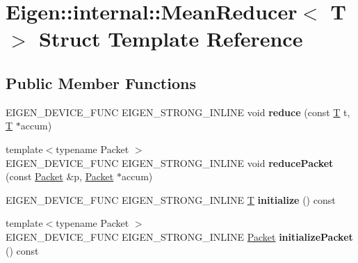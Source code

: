 \hypertarget{struct_eigen_1_1internal_1_1_mean_reducer}{}\section{Eigen\+:\+:internal\+:\+:Mean\+Reducer$<$ T $>$ Struct Template Reference}
\label{struct_eigen_1_1internal_1_1_mean_reducer}
\subsection*{Public Member Functions}
\begin{DoxyCompactItemize}
\item 
\mbox{\label{struct_eigen_1_1internal_1_1_mean_reducer_adecc23997b0000f8d1ab64e25ab0dee4}} 
E\+I\+G\+E\+N\+\_\+\+D\+E\+V\+I\+C\+E\+\_\+\+F\+U\+NC E\+I\+G\+E\+N\+\_\+\+S\+T\+R\+O\+N\+G\+\_\+\+I\+N\+L\+I\+NE void {\bfseries reduce} (const \hyperlink{group___sparse_core___module}{T} t, \hyperlink{group___sparse_core___module}{T} $\ast$accum)
\item 
\mbox{\label{struct_eigen_1_1internal_1_1_mean_reducer_a5f5ab34d27356ed03bf03c53be5820e3}} 
{\footnotesize template$<$typename Packet $>$ }\\E\+I\+G\+E\+N\+\_\+\+D\+E\+V\+I\+C\+E\+\_\+\+F\+U\+NC E\+I\+G\+E\+N\+\_\+\+S\+T\+R\+O\+N\+G\+\_\+\+I\+N\+L\+I\+NE void {\bfseries reduce\+Packet} (const \hyperlink{union_eigen_1_1internal_1_1_packet}{Packet} \&p, \hyperlink{union_eigen_1_1internal_1_1_packet}{Packet} $\ast$accum)
\item 
\mbox{\label{struct_eigen_1_1internal_1_1_mean_reducer_aafe198895bac3ca4733fa15d17240dd3}} 
E\+I\+G\+E\+N\+\_\+\+D\+E\+V\+I\+C\+E\+\_\+\+F\+U\+NC E\+I\+G\+E\+N\+\_\+\+S\+T\+R\+O\+N\+G\+\_\+\+I\+N\+L\+I\+NE \hyperlink{group___sparse_core___module}{T} {\bfseries initialize} () const
\item 
\mbox{\label{struct_eigen_1_1internal_1_1_mean_reducer_a8a816de00e834e5a27a80308792ec738}} 
{\footnotesize template$<$typename Packet $>$ }\\E\+I\+G\+E\+N\+\_\+\+D\+E\+V\+I\+C\+E\+\_\+\+F\+U\+NC E\+I\+G\+E\+N\+\_\+\+S\+T\+R\+O\+N\+G\+\_\+\+I\+N\+L\+I\+NE \hyperlink{union_eigen_1_1internal_1_1_packet}{Packet} {\bfseries initialize\+Packet} () const

\end{DoxyCompactItemize}
